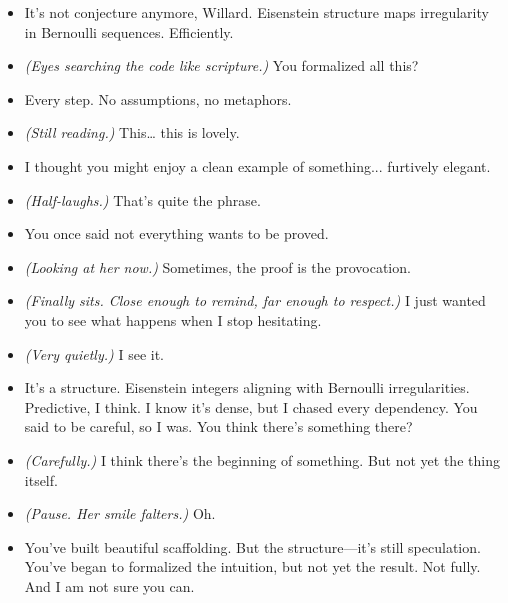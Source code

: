 \begin{itemize}
    \item[\textbf{Jovannah:}] It’s not conjecture anymore, Willard. Eisenstein structure maps irregularity in Bernoulli sequences. Efficiently. 

    \item[\textbf{Willard:}] \textit{(Eyes searching the code like scripture.)} You formalized all this?

    \item[\textbf{Jovannah:}] Every step. No assumptions, no metaphors.

    \item[\textbf{Willard:}] \textit{(Still reading.)} This… this is lovely.

    \item[\textbf{Jovannah:}] I thought you might enjoy a clean example of something... furtively elegant.

    \item[\textbf{Willard:}] \textit{(Half-laughs.)} That’s quite the phrase.

    \item[\textbf{Jovannah:}] You once said not everything wants to be proved.

    \item[\textbf{Willard:}] \textit{(Looking at her now.)} Sometimes, the proof is the provocation.

    \item[\textbf{Jovannah:}] \textit{(Finally sits. Close enough to remind, far enough to respect.)} I just wanted you to see what happens when I stop hesitating.

    \item[\textbf{Willard:}] \textit{(Very quietly.)} I see it.

    \item[\textbf{Jovannah:}] It’s a structure. Eisenstein integers aligning with Bernoulli irregularities. Predictive, I think. I know it’s dense, but I chased every dependency. You said to be careful, so I was. You think there’s something there?

    \item[\textbf{Willard:}] \textit{(Carefully.)} I think there’s the beginning of something. But not yet the thing itself.

    \item[\textbf{Jovannah:}] \textit{(Pause. Her smile falters.)} Oh.

    \item[\textbf{Willard:}] You’ve built beautiful scaffolding. But the structure—it's still speculation. You’ve began to formalized the intuition, but not yet the result. Not fully. And I am not sure you can.


\end{itemize}
